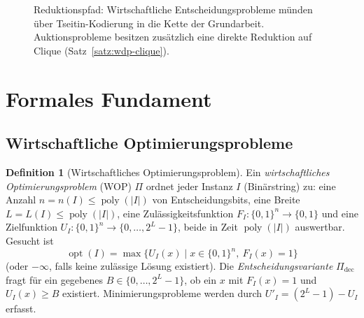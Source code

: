 \documentclass[a4paper,12pt]{article}
\theoremstyle{definition}
\newtheorem{definition}{Definition}[section]
\newcommand{\bits}{\{0,1\}}
\newcommand{\opt}{\operatorname{opt}}
\newcommand{\poly}{\operatorname{poly}}
\begin{document}
\begin{figure}[ht]
\centering
{}
\caption{Reduktionspfad: Wirtschaftliche Entscheidungsprobleme münden über Tseitin-Kodierung in die Kette der Grundarbeit. Auktionsprobleme besitzen zusätzlich eine direkte Reduktion auf Clique (Satz~\ref{satz:wdp-clique}).}
\label{fig:pfad}
\end{figure}

\section{Formales Fundament}
\label{eco:foundation}

\subsection{Wirtschaftliche Optimierungsprobleme}

\begin{definition}[Wirtschaftliches Optimierungsproblem]\label{def:wop}
Ein \emph{wirtschaftliches Optimierungsproblem} (WOP) \(\Pi\) ordnet jeder Instanz \(I\) (Binärstring) zu: eine Anzahl \(n=n(I)\le\poly(|I|)\) von Entscheidungsbits, eine Breite \(L=L(I)\le\poly(|I|)\), eine Zulässigkeitsfunktion \(F_I:\bits^n\to\bits\) und eine Zielfunktion \(U_I:\bits^n\to\{0,\dots,2^L-1\}\), beide in Zeit \(\poly(|I|)\) auswertbar. Gesucht ist
\[
  \opt(I)=\max\{U_I(x)\mid x\in\bits^n,\ F_I(x)=1\}
\]
(oder \(-\infty\), falls keine zulässige Lösung existiert). Die \emph{Entscheidungsvariante} \(\Pi_{\mathrm{dec}}\) fragt für ein gegebenes \(B\in\{0,\dots,2^L-1\}\), ob ein \(x\) mit \(F_I(x)=1\) und \(U_I(x)\ge B\) existiert. Minimierungsprobleme werden durch \(U'_I=(2^L-1)-U_I\) erfasst.
\end{definition}
\end{document}
